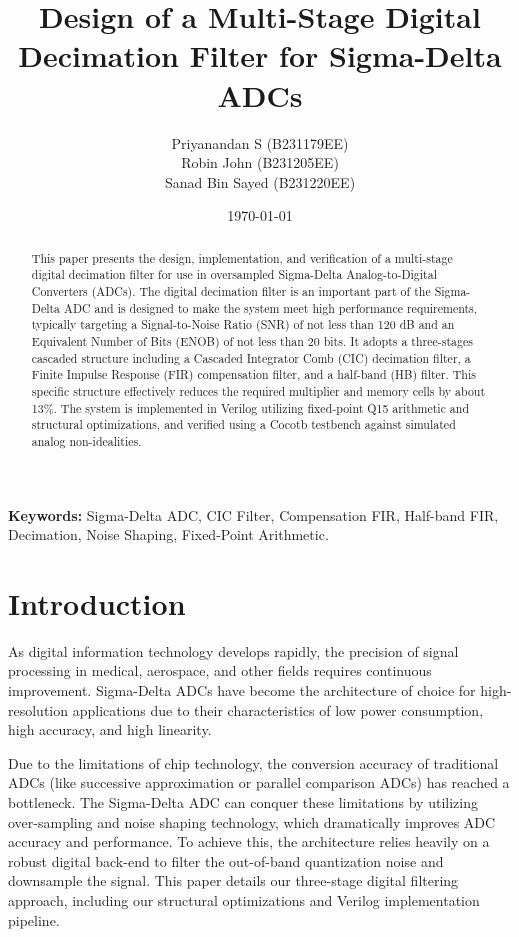 \documentclass[12pt, a4paper]{article}
\title{\textbf{Design of a Multi-Stage Digital Decimation Filter for Sigma-Delta ADCs}}
\author{
    Priyanandan S (B231179EE) \\
    Robin John (B231205EE) \\
    Sanad Bin Sayed (B231220EE)
}
\date{\today}
\begin{document}
\maketitle

\begin{abstract}
This paper presents the design, implementation, and verification of a multi-stage digital decimation filter for use in oversampled Sigma-Delta Analog-to-Digital Converters (ADCs). The digital decimation filter is an important part of the Sigma-Delta ADC and is designed to make the system meet high performance requirements, typically targeting a Signal-to-Noise Ratio (SNR) of not less than 120 dB and an Equivalent Number of Bits (ENOB) of not less than 20 bits. It adopts a three-stages cascaded structure including a Cascaded Integrator Comb (CIC) decimation filter, a Finite Impulse Response (FIR) compensation filter, and a half-band (HB) filter. This specific structure effectively reduces the required multiplier and memory cells by about 13\%. The system is implemented in Verilog utilizing fixed-point Q15 arithmetic and structural optimizations, and verified using a Cocotb testbench against simulated analog non-idealities.
\end{abstract}

\noindent\textbf{Keywords:} Sigma-Delta ADC, CIC Filter, Compensation FIR, Half-band FIR, Decimation, Noise Shaping, Fixed-Point Arithmetic.

\newpage
\tableofcontents
\newpage

\section{Introduction}
As digital information technology develops rapidly, the precision of signal processing in medical, aerospace, and other fields requires continuous improvement. Sigma-Delta ADCs have become the architecture of choice for high-resolution applications due to their characteristics of low power consumption, high accuracy, and high linearity. 

Due to the limitations of chip technology, the conversion accuracy of traditional ADCs (like successive approximation or parallel comparison ADCs) has reached a bottleneck. The Sigma-Delta ADC can conquer these limitations by utilizing over-sampling and noise shaping technology, which dramatically improves ADC accuracy and performance. To achieve this, the architecture relies heavily on a robust digital back-end to filter the out-of-band quantization noise and downsample the signal. This paper details our three-stage digital filtering approach, including our structural optimizations and Verilog implementation pipeline.
\end{document}
